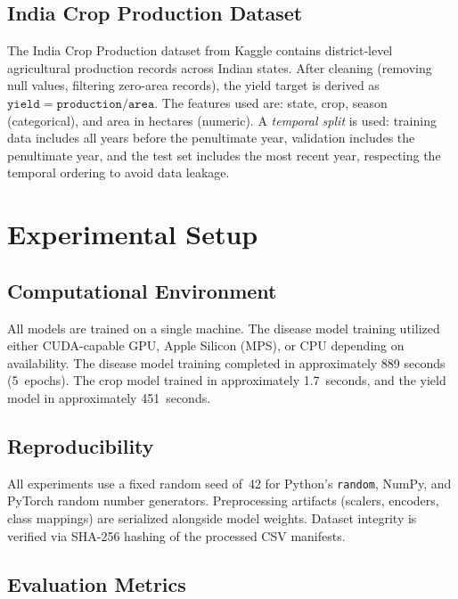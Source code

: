 \documentclass[conference]{IEEEtran}
\begin{document}
\subsection{India Crop Production Dataset}
The India Crop Production dataset from Kaggle contains district-level agricultural production records across Indian states. After cleaning (removing null values, filtering zero-area records), the yield target is derived as $\texttt{yield} = \texttt{production} / \texttt{area}$. The features used are: state, crop, season (categorical), and area in hectares (numeric). A \emph{temporal split} is used: training data includes all years before the penultimate year, validation includes the penultimate year, and the test set includes the most recent year, respecting the temporal ordering to avoid data leakage.


\section{Experimental Setup}
\label{sec:experiments}

\subsection{Computational Environment}
All models are trained on a single machine. The disease model training utilized either CUDA-capable GPU, Apple Silicon (MPS), or CPU depending on availability. The disease model training completed in approximately 889 seconds (5~epochs). The crop model trained in approximately 1.7~seconds, and the yield model in approximately 451~seconds.

\subsection{Reproducibility}
All experiments use a fixed random seed of~42 for Python's \texttt{random}, NumPy, and PyTorch random number generators. Preprocessing artifacts (scalers, encoders, class mappings) are serialized alongside model weights. Dataset integrity is verified via SHA-256 hashing of the processed CSV manifests.

\subsection{Evaluation Metrics}
\end{document}
